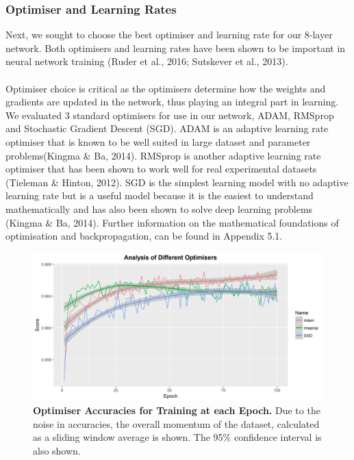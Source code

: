 \documentclass{article}
\begin{document}
\subsubsection{Optimiser and Learning Rates}
Next, we sought to choose the best optimiser and learning rate for our 8-layer network. Both optimisers and learning rates have been shown to be important in neural network training (Ruder et al., 2016; Sutskever et al., 2013).\\\\
Optimiser choice is critical as the optimisers determine how the weights and gradients are updated in the network, thus playing an integral part in learning. We evaluated 3 standard optimisers for use in our network, ADAM, RMSprop and Stochastic Gradient Descent (SGD). ADAM is an adaptive learning rate optimiser that is known to be well suited in large dataset and parameter problems(Kingma \& Ba, 2014). RMSprop is another adaptive learning rate optimiser that has been shown to work well for real experimental datasets (Tieleman \& Hinton, 2012). SGD is the simplest learning model with no adaptive learning rate but is a useful model because it is the easiest to understand mathematically and has also been shown to solve deep learning problems (Kingma \& Ba, 2014).  Further information on the mathematical foundations of optimisation and backpropagation, can be found in Appendix 5.1. 
\begin{figure}[H]
\includegraphics[width=\textwidth]{optimiserlearning.jpg}
\centering
\caption{\textbf{Optimiser Accuracies for Training at each Epoch.} Due to the noise in accuracies, the overall momentum of the dataset, calculated as a sliding window average is shown. The 95\% confidence interval is also shown.}
\end{figure}
\end{document}
